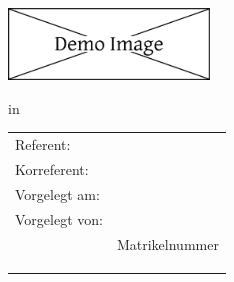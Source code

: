 \begin{titlepage}
	\begin{flushright}
		\includegraphics[width=0.4\textwidth]{images/hfu_logo.eps}
	\end{flushright}

	\begin{center}
		{
			\Large\selectfont
			\setlength\parskip{0pt}
			
			\metadataType
			
			in
			
			\metadataCourse
			
			\vspace{1cm}
			
			\LARGE\textbf{\metadataTitle}
			
			\vspace{.5cm}
			
			\Large\metadataSubtitle
			
			\vfill\vfill\vfill
		}
	
		\begin{tabular}{ll}
			
			Referent: & \metadataConsultant \\
			Korreferent: & \metadataCoconsultant \\
			Vorgelegt am: & \metadataSubmitDate \\
			Vorgelegt von: & \metadataAuthor \\
			& Matrikelnummer \metadataMatriculationNumber \\
			& \metadataStreetNumber \\
			& \metadataPostalCodeTown \\
			& \metadataEmail \\
			
		\end{tabular}
		\vfill
	\end{center}
\end{titlepage}